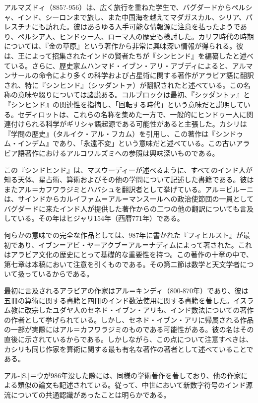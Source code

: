 \documentclass[a4paper,11pt,openany]{ltjsbook}
\begin{document}
アルマズドィ（885?-956）は、広く旅行を重ねた学生で、バグダードからペルシャ、インド、シーロンまで旅し、また中国海を越えてマダガスカル、シリア、パレスチナにも訪れた。彼はあらゆる入手可能な情報源に注意を払ったようであり、ペルシア人、ヒンドゥー人、ローマ人の歴史も検討した。カリフ時代の時期については、『金の草原』という著作から非常に興味深い情報が得られる。彼は、王によって招集されたインドの賢者たちが『シンヒンド』を編纂したと述べている。さらに、歴史家ムハンマド・イブン・アリ・アブディによると、アルマンサールの命令により多くの科学および占星術に関する著作がアラビア語に翻訳され、特に『シンヒンド』（シッダントァ）が翻訳されたと述べている。この名称の意味や綴りについては諸説ある。コルブロックは最初、『シッダントァ』と『シンヒンド』の関連性を指摘し、「回転する時代」という意味だと説明している。セディロットは、これらの名称を集めた一方で、一般的にヒンドゥー人に関連付けられる科学がギリシャ語起源である可能性があると主張した。カシリは『学問の歴史』（タルイク・アル・フカム）を引用し、この著作は『シンドゥム・インデム』であり、「永遠不変」という意味だと述べている。この古いアラビア語著作におけるアルコワルズミへの参照は興味深いものである。

この『シンドヒンド』は、マスウーディーが述べるように、すべてのインド人が知る天体、星占術、算術およびその他の学問について記述した書籍である。彼はまたアル＝カフワラジミとハバシュを翻訳者として挙げている。アル＝ビルーニは、サインドからカルイファム＝アル＝マンスールへの政治使節団の一員としてバグダードに来たインド人が提供した著作からの二つの他の翻訳についても言及している。その年はヒジャリ154年（西暦771年）である。

何らかの意味での完全な作品としては、987年に書かれた『フィヒルスト』が最初であり、イブン＝アビ・ヤーアクブ＝アル＝ナディムによって著された。これはアラビア文化の歴史にとって基礎的な重要性を持つ。この著作の十章の中で、第七章は本稿において注意を引くものである。その第二節は数学と天文学者について扱っているからである。

最初に言及されるアラビアの作家はアル＝キンディ（800-870年）であり、彼は五冊の算術に関する書籍と四冊のインド数法使用に関する書籍を著した。イスラム教に改宗したユダヤ人のセネド・イブン・アリも、インド数法についての著作の作者として挙げられている。しかし、セネド・イブン・アリに帰属される作品の一部が実際にはアル＝カフワラジミのものである可能性がある。彼の名はその直後に示されているからである。しかしながら、この点について注意すべきは、カシリも同じ作家を算術に関する最も有名な著作の著者として述べていることである。

アル-[S.]＝ウが986年没した際には、同様の学術著作を著しており、他の作家による類似の論文も記述されている。従って、中世において新数字符号のインド源流についての共通認識があったことは明らかである。
\end{document}
